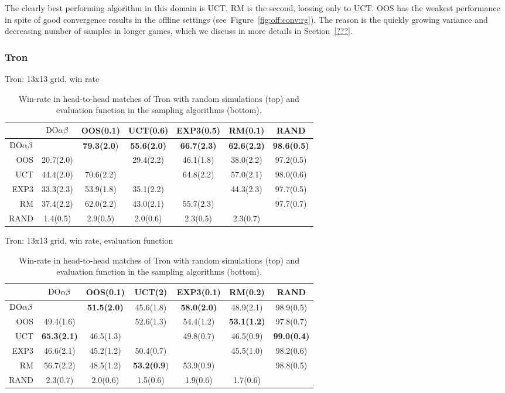 The clearly best performing algorithm in this domain is UCT.
RM is the second, loosing only to UCT.
OOS has the weakest performance in spite of good convergence results in the offline settings (see~Figure~\ref{fig:off:conv:rg}). The reason is the quickly growing variance and decreasing number of samples in longer games, which we discuss in more details in Section~\ref{???}.

\subsubsection{Tron}

\begin{table}[t!]
\centering
\begin{scriptsize}
Tron: 13x13 grid, win rate
\begin{tabular}{|r|cccccc|}\hline
&$\textrm{DO}\alpha\beta$&OOS(0.1)&UCT(0.6)&EXP3(0.5)&RM(0.1)&RAND\\\hline
$\textrm{DO}\alpha\beta$&&\textbf{79.3(2.0})&\textbf{55.6(2.0)}&\textbf{66.7(2.3)}&\textbf{62.6(2.2)}&\textbf{98.6(0.5)}\\
OOS&20.7(2.0)&&29.4(2.2)&46.1(1.8)&38.0(2.2)&97.2(0.5)\\
UCT&44.4(2.0)&70.6(2.2)&&64.8(2.2)&57.0(2.1)&98.0(0.6)\\
EXP3&33.3(2.3)&53.9(1.8)&35.1(2.2)&&44.3(2.3)&97.7(0.5)\\
RM&37.4(2.2)&62.0(2.2)&43.0(2.1)&55.7(2.3)&&97.7(0.7)\\
RAND&1.4(0.5)&2.9(0.5)&2.0(0.6)&2.3(0.5)&2.3(0.7)&\\
\hline
\end{tabular}

Tron: 13x13 grid, win rate, evaluation function
\begin{tabular}{|r|cccccc|}\hline
&$\textrm{DO}\alpha\beta$&OOS(0.1)&UCT(2)&EXP3(0.1)&RM(0.2)&RAND\\\hline
$\textrm{DO}\alpha\beta$&&\textbf{51.5(2.0)}&45.6(1.8)&\textbf{58.0(2.0)}&48.9(2.1)&98.9(0.5)\\
OOS&49.4(1.6)&&52.6(1.3)&54.4(1.2)&\textbf{53.1(1.2)}&97.8(0.7)\\
UCT&\textbf{65.3(2.1)}&46.5(1.3)&&49.8(0.7)&46.5(0.9)&\textbf{99.0(0.4)}\\
EXP3&46.6(2.1)&45.2(1.2)&50.4(0.7)&&45.5(1.0)&98.2(0.6)\\
RM&56.7(2.2)&48.5(1.2)&\textbf{53.2(0.9})&53.9(0.9)&&98.8(0.5)\\
RAND&2.3(0.7)&2.0(0.6)&1.5(0.6)&1.9(0.6)&1.7(0.6)&\\
\hline
\end{tabular}
\end{scriptsize}
\caption{Win-rate in head-to-head matches of Tron with random simulations (top) and evaluation function in the sampling algorithms (bottom).}\label{fig:matches:tron}
\end{table}

